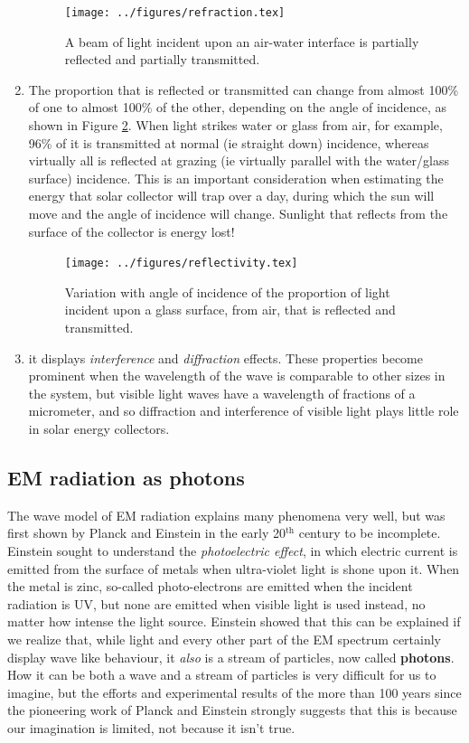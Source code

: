 \documentclass[class=scrartcl, crop=false,parskip=half]{standalone}
\begin{document}
\begin{enumerate}
\begin{figure}
\centering
\texttt{[image: ../figures/refraction.tex]}
\caption{A beam of light incident upon an air-water interface is partially reflected and partially transmitted.}
\label{fig:refraction}
\end{figure}
\item The proportion that is reflected or transmitted can change from almost 100\% of one to almost 100\% of the other, depending on the angle of incidence, as shown in Figure \ref{fig:reflectivity}. When light strikes water or glass  from air, for example, 96\% of it is transmitted at normal (ie straight down) incidence, whereas virtually all is reflected at grazing (ie virtually parallel with the water/glass surface) incidence. This is an important consideration when estimating the energy that solar collector will trap over a day, during which the sun will move and the angle of incidence will change. Sunlight that reflects from the surface of the collector is energy lost!
\begin{figure}
\centering
\texttt{[image: ../figures/reflectivity.tex]}
\caption{Variation with angle of incidence of the proportion of light incident upon a glass surface, from air, that is reflected and transmitted.}
\label{fig:reflectivity}
\end{figure}
\item it displays \emph{interference} and \emph{diffraction} effects. These properties become prominent when the wavelength of the wave is comparable to other sizes in the system, but visible light waves have a wavelength of fractions of a micrometer, and so diffraction and interference of visible light plays little role in solar energy collectors.
\end{enumerate}
\subsection{EM radiation as photons}
The wave model of EM radiation  explains many phenomena very well, but was first shown by Planck and Einstein in the early 20$^{\text{th}}$ century to be incomplete. Einstein sought to understand the \emph{photoelectric effect}, in which electric current is emitted from the surface of metals when ultra-violet light is shone upon it. When the metal is zinc, so-called photo-electrons are emitted when the incident radiation is UV, but none are emitted when visible light is used instead, no matter how intense the light source.
Einstein showed that this can be explained if we realize that, while light and every other part of the EM spectrum certainly display wave like behaviour, it \emph{also} is a stream of particles, now called \textbf{photons}. How it can be both a wave and a stream of particles is very difficult for us to imagine, but the efforts and experimental results of the more than 100 years since the pioneering work of Planck and Einstein strongly suggests that this is because our imagination is limited, not because it isn't true.
\end{document}
